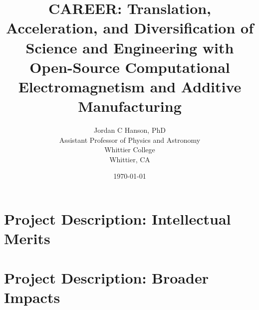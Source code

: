 \documentclass[10pt,twoside,openany]{book}
\title{CAREER: Translation, Acceleration, and Diversification of Science and Engineering with Open-Source Computational Electromagnetism and Additive Manufacturing}
\author{Jordan C Hanson, PhD \\ Assistant Professor of Physics and Astronomy \\ Whittier College \\ Whittier, CA}
\date{\today}
\begin{document}
\begin{flushleft}

\end{flushleft}

\begin{flushleft}

\end{flushleft}

\maketitle
\tableofcontents
\thispagestyle{empty}

\chapter{Project Description: Intellectual Merits}
\thispagestyle{empty}
\begin{flushleft}

\end{flushleft}

\chapter{Project Description: Broader Impacts}
\thispagestyle{empty}
\begin{flushleft}

\end{flushleft}

\small


 
\end{document}
